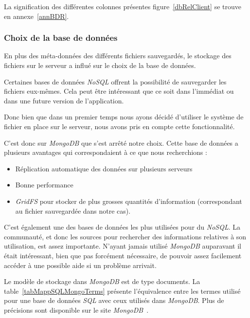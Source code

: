 \documentclass[a4paper,10pt, twoside]{report}
\begin{document}
\begin{spacing}{1.2}
La signification des différentes colonnes présentes figure~\ref{dbRelClient}
se trouve en annexe~\ref{annBDR}.

\subsubsection{Choix de la base de données}
En plus des méta-données des différents fichiers sauvegardés, le
stockage des fichiers sur le serveur a influé sur le choix de la base de
données. 

Certaines bases de données \textit{NoSQL} offrent la possibilité de 
sauvegarder les fichiers eux-mêmes. Cela peut être intéressant que ce
soit dans l'immédiat ou dans une future version de l'application.

Donc bien que dans un premier temps nous ayons décidé d'utiliser le
système de fichier en place sur le serveur, nous avons pris en compte cette
fonctionnalité.

C'est donc sur \textit{MongoDB} que s'est arrêté notre choix. Cette base
de données a plusieurs avantages qui correspondaient à ce que nous
recherchions :

\begin{itemize}
 \item Réplication automatique des données sur plusieurs serveurs
 \item Bonne performance
 \item \textit{GridFS} pour stocker de plus grosses quantités d'information
 (correspondant au fichier sauvegardée dans notre cas).
\end{itemize}

C'est également une des bases de données les plus utilisées pour du
\textit{NoSQL}. La communauté, et donc les sources pour rechercher des
informations relatives à son utilisation, est assez importante. N'ayant
jamais utilisé \textit{MongoDB} auparavant il était intéressant, bien que
pas forcément nécessaire, de pouvoir assez facilement accéder à une
possible aide si un problème arrivait.

Le modèle de stockage dans \textit{MongoDB} est de type documents. La
table~\ref{tabMappSQLMongoTerms} présente l'équivalence entre les termes
utilisé pour une base de données \textit{SQL} avec ceux utilisés dans
\textit{MongoDB}. Plus de précisions sont disponible sur le site
\textit{MongoDB}~\cite{refMappingSQLMDB}.


\end{spacing}
\end{document}
